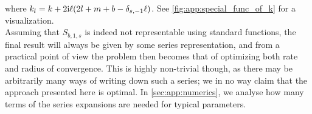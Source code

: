where $k_l = k + 2\text{i}\ell (2l + m + b - \delta_{s,-1}\ell)$.
See \autoref{fig:app:special_func_of_k} for a visualization.\\
Assuming that $S_{b,1,s}$ is indeed not representable using standard functions, the final result will always be given by some series representation, and from a practical point of view the problem then becomes that of optimizing both rate and radius of convergence.
This is highly non-trivial though, as there may be arbitrarily many ways of writing down such a series;  we in no way claim that the approach presented here is optimal.
In \autoref{sec:app:numerics}, we analyse how many terms of the series expansions are needed for typical parameters.
